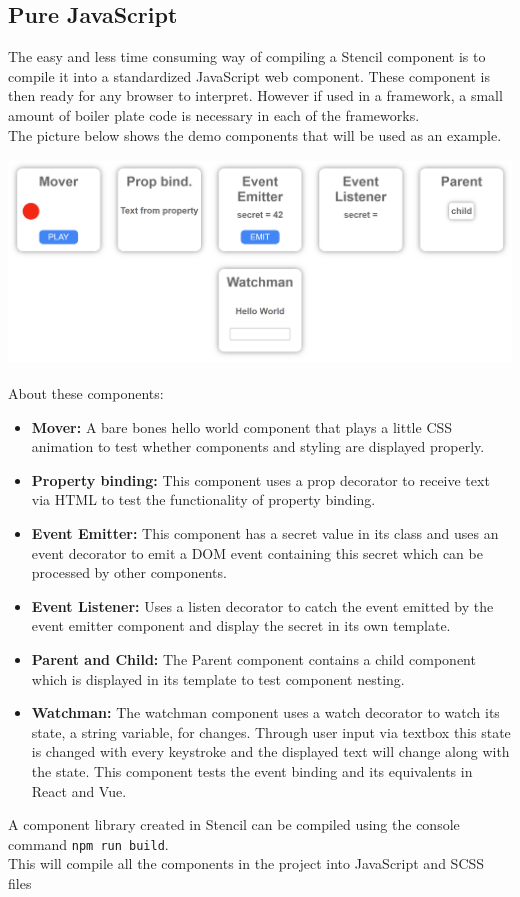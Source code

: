 \subsection{Pure JavaScript}
The easy and less time consuming way of compiling a Stencil component is to compile it into a standardized JavaScript web component. These component is then ready for any browser to interpret. However if used in a framework, a small amount of boiler plate code is necessary in each of the frameworks.\\[0.5cm]
%
The picture below shows the demo components that will be used as an example. 
\includegraphics [height=6.2cm, width=15cm] {images/demopage}
About these components:
\begin{itemize}
\item \textbf{Mover:} A bare bones hello world component that plays a little CSS animation to test whether components and styling are displayed properly.
\item \textbf{Property binding:} This component uses a prop decorator to receive text via HTML to test the functionality of property binding.
\item \textbf{Event Emitter:} This component has a secret value in its class and uses an event decorator to emit a DOM event containing this secret which can be processed by other components.
\item \textbf{Event Listener:} Uses a listen decorator to catch the event emitted by the event emitter component and display the secret in its own template.
\item \textbf{Parent and Child:} The Parent component contains a child component which is displayed in its template to test component nesting.
\item \textbf{Watchman:} The watchman component uses a watch decorator to watch its state, a string variable, for changes. Through user input via textbox this state is changed with every keystroke and the displayed text will change along with the state. This component tests the event binding and its equivalents in React and Vue.
\end{itemize}
A component library created in Stencil can be compiled using the console command \verb+npm run build+.\\
This will compile all the components in the project into JavaScript and SCSS files
